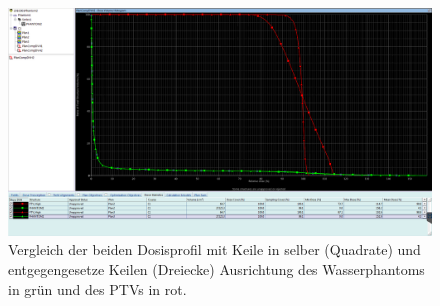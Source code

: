 \begin{figure}[H]
	\centering
	\includegraphics[width=0.7\linewidth]{../../Wasserphantom Bilder/Aufgabe234.png}
	\caption{Vergleich der beiden Dosisprofil mit Keile in selber (Quadrate) und entgegengesetze Keilen (Dreiecke) Ausrichtung des Wasserphantoms in grün und des PTVs in rot. }
	\label{fig:aufgabe234}
\end{figure}
